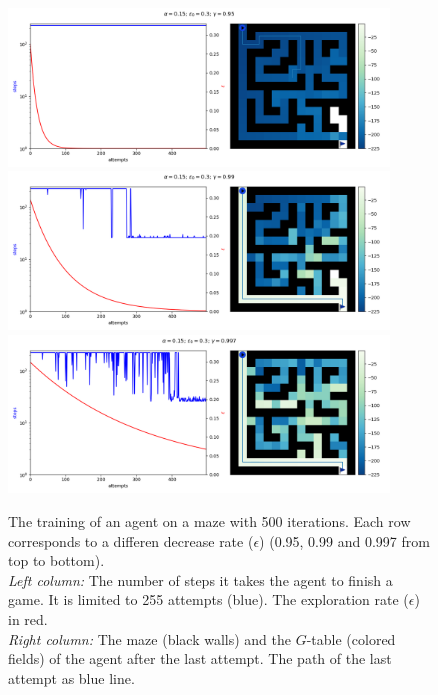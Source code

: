 \documentclass[12pt,a4paper]{scrartcl}
\begin{document}
\begin{figure}[htbp]
    \centering
    \includegraphics[width=0.9\textwidth]{parameters/big_mazeN500_lr0.15_er0.30_dr0.95000.png}
    \includegraphics[width=0.9\textwidth]{parameters/big_mazeN500_lr0.15_er0.30_dr0.99000.png}
    \includegraphics[width=0.9\textwidth]{parameters/big_mazeN500_lr0.15_er0.30_dr0.99700.png}
    \caption{
        The training of an agent on a maze with 500 iterations.
        Each row corresponds to a differen decrease rate ($\epsilon$) (0.95,
        0.99 and 0.997 from top to bottom). \\
        \textit{Left column:} The number of steps it takes the agent to finish a
        game. It is limited to 255 attempts (blue). The exploration rate 
        ($\epsilon$) in red. \\
        \textit{Right column:}  The maze (black walls) and the $G$-table
        (colored fields) of the agent after the last attempt. The path of the
        last attempt as blue line.
    }
    \label{fig:big_maze_decrease_rate}
\end{figure}
\end{document}
